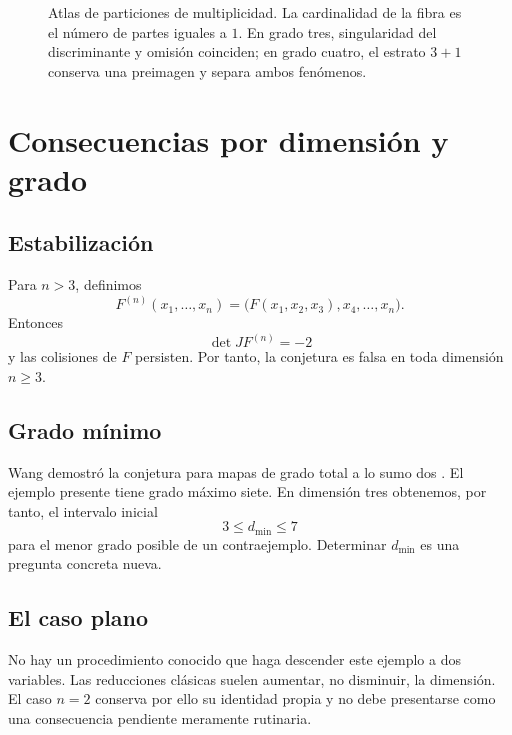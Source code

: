\documentclass[11pt]{article}
\theoremstyle{definition}
\theoremstyle{remark}
\begin{document}
\begin{figure}[htbp]
\caption{Atlas de particiones de multiplicidad. La cardinalidad de la fibra
es el n\'umero de partes iguales a $1$. En grado tres, singularidad del
discriminante y omisi\'on coinciden; en grado cuatro, el estrato $3+1$ conserva
una preimagen y separa ambos fen\'omenos.}
\label{fig:multiplicity-atlas}
\end{figure}

\section{Consecuencias por dimensi\'on y grado}

\subsection{Estabilizaci\'on}

Para $n>3$, definimos
\[
F^{(n)}(x_1,\ldots,x_n)=
\bigl(F(x_1,x_2,x_3),x_4,\ldots,x_n\bigr).
\]
Entonces
\[
\det JF^{(n)}=-2
\]
y las colisiones de $F$ persisten. Por tanto, la conjetura es falsa en toda
dimensi\'on $n\geq3$.

\subsection{Grado m\'inimo}

Wang demostr\'o la conjetura para mapas de grado total a lo sumo dos
\cite{Wang1980}. El ejemplo presente tiene grado m\'aximo siete. En dimensi\'on
tres obtenemos, por tanto, el intervalo inicial
\[
3\leq d_{\min}\leq7
\]
para el menor grado posible de un contraejemplo. Determinar $d_{\min}$ es una
pregunta concreta nueva.

\subsection{El caso plano}

No hay un procedimiento conocido que haga descender este ejemplo a dos
variables. Las reducciones cl\'asicas suelen aumentar, no disminuir, la
dimensi\'on. El caso $n=2$ conserva por ello su identidad propia y no debe
presentarse como una consecuencia pendiente meramente rutinaria.
\end{document}
